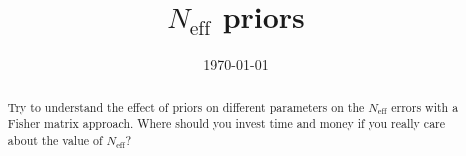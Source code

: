 \documentclass[aps,prl,preprint,groupedaddress]{revtex4-1}
\begin{document}
\graphicspath{{../images/}}


\title{$N_{\text{eff}}$ priors}


\author{}
\affiliation{}


\date{\today}

\begin{abstract}
Try to understand the effect of priors on different parameters on the $N_{\text{eff}}$ errors with a Fisher matrix approach. Where should you invest time and money if you really care about the value of $N_{\text{eff}}$?

\end{abstract}

\pacs{}

\maketitle
\end{document}
